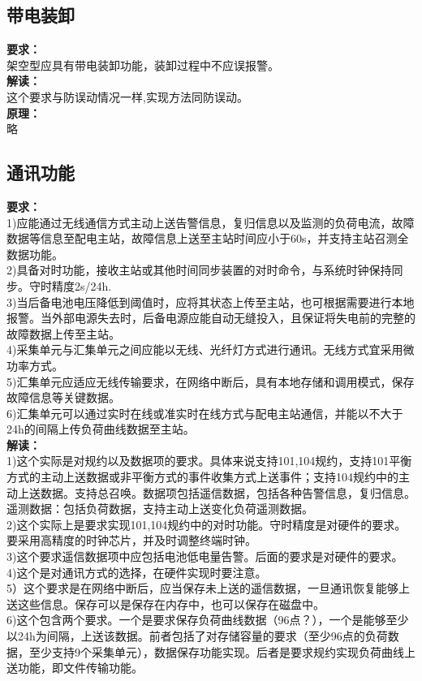 \documentclass{article}
\begin{document}
\begin{CJK}{UTF8}{gbsn}
\subsection{ 带电装卸}
	\par
	\textbf{要求：}\\
	架空型应具有带电装卸功能，装卸过程中不应误报警。\\
	\textbf{解读：}\\
	这个要求与防误动情况一样,实现方法同防误动。\\
	\textbf{原理：}\\
	略
\subsection{ 通讯功能}
	\par
	\textbf{要求：}\\
	1)应能通过无线通信方式主动上送告警信息，复归信息以及监测的负荷电流，故障数据等信息至配电主站，故障信息上送至主站时间应小于60s，并支持主站召测全数据功能。\\
	2)具备对时功能，接收主站或其他时间同步装置的对时命令，与系统时钟保持同步。守时精度2s/24h.\\
	3)当后备电池电压降低到阈值时，应将其状态上传至主站，也可根据需要进行本地报警。当外部电源失去时，后备电源应能自动无缝投入，且保证将失电前的完整的故障数据上传至主站。\\
	4)采集单元与汇集单元之间应能以无线、光纤灯方式进行通讯。无线方式宜采用微功率方式。\\
	5)汇集单元应适应无线传输要求，在网络中断后，具有本地存储和调用模式，保存故障信息等关键数据。\\
	6)汇集单元可以通过实时在线或准实时在线方式与配电主站通信，并能以不大于24h的间隔上传负荷曲线数据至主站。\\
	\textbf{解读：}\\
	1)这个实际是对规约以及数据项的要求。具体来说支持101,104规约，支持101平衡方式的主动上送数据或非平衡方式的事件收集方式上送事件；支持104规约中的主动上送数据。支持总召唤。数据项包括遥信数据，包括各种告警信息，复归信息。遥测数据：包括负荷数据，支持主动上送变化负荷遥测数据。\\
	2)这个实际上是要求实现101,104规约中的对时功能。守时精度是对硬件的要求。要采用高精度的时钟芯片，并及时调整终端时钟。\\
	3)这个要求遥信数据项中应包括电池低电量告警。后面的要求是对硬件的要求。\\
	4)这个是对通讯方式的选择，在硬件实现时要注意。\\
	5）这个要求是在网络中断后，应当保存未上送的遥信数据，一旦通讯恢复能够上送这些信息。保存可以是保存在内存中，也可以保存在磁盘中。\\
	6)这个包含两个要求。一个是要求保存负荷曲线数据（96点？），一个是能够至少以24h为间隔，上送该数据。前者包括了对存储容量的要求（至少96点的负荷数据，至少支持9个采集单元），数据保存功能实现。后者是要求规约实现负荷曲线上送功能，即文件传输功能。

\end{CJK}
\end{document}
